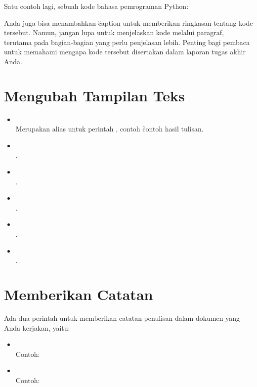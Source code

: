 Satu contoh lagi, sebuah kode bahasa pemrograman Python:


Anda juga bisa menambahkan \f{caption} untuk memberikan ringkasan tentang kode tersebut.
Namun, jangan lupa untuk menjelaskan kode melalui paragraf, terutama pada bagian-bagian yang perlu penjelasan lebih.
Penting bagi pembaca untuk memahami mengapa kode tersebut disertakan dalam laporan tugas akhir Anda.

\section{Mengubah Tampilan Teks}
\begin{itemize}
	\item {} \\
	Merupakan alias untuk perintah , contoh 
	\f{contoh hasil tulisan}.
	\item {} \\
	.
	\item {} \\
	.
	\item {} \\
	.
	\item {} \\
	.
	\item {} \\
	.
\end{itemize}


\section{Memberikan Catatan}
Ada dua perintah untuk memberikan catatan penulisan dalam dokumen yang Anda kerjakan, yaitu: 
\begin{itemize}
	\item {} \\
	Contoh: \\ 
	\item {} \\ 
	Contoh: \todoCite
\end{itemize}


